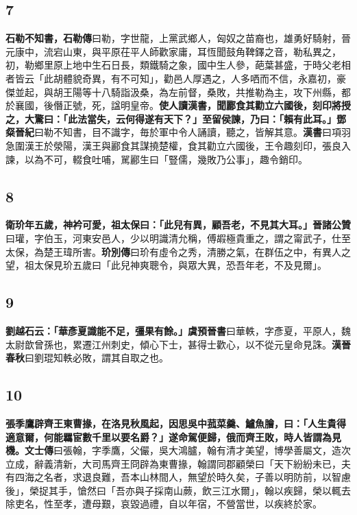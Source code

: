 \subsection*{7}

\textbf{石勒不知書，}{\footnotesize \textbf{石勒傳}曰勒，字世龍，上黨武鄉人，匈奴之苗裔也，雄勇好騎射，晉元康中，流宕山東，與平原茌平人師歡家庸，耳恆聞鼓角鞞鐸之音，勒私異之，初，勒鄉里原上地中生石日長，類鐵騎之象，國中生人參，葩葉甚盛，于時父老相者皆云「此胡體貌奇異，有不可知」，勸邑人厚遇之，人多哂而不信，永嘉初，豪傑並起，與胡王陽等十八騎詣汲桑，為左前督，桑敗，共推勒為主，攻下州縣，都於襄國，後僭正號，死，諡明皇帝。}\textbf{使人讀漢書，聞酈食其勸立六國後，刻印將授之，大驚曰：「此法當失，云何得遂有天下？」至留侯諫，乃曰：「賴有此耳。」}{\footnotesize \textbf{鄧粲晉紀}曰勒不知書，目不識字，毎於軍中令人誦讀，聽之，皆解其意。\textbf{漢書}曰項羽急圍漢王於滎陽，漢王與酈食其謀撓楚權，食其勸立六國後，王令趣刻印，張良入諫，以為不可，輟食吐哺，駡酈生曰「豎儒，幾敗乃公事」，趣令銷印。}

\subsection*{8}

\textbf{衛玠年五歲，神衿可愛，祖太保曰：「此兒有異，顧吾老，不見其大耳。」}{\footnotesize \textbf{晉諸公贊}曰瓘，字伯玉，河東安邑人，少以明識清允稱，傅嘏極貴重之，謂之甯武子，仕至太保，為楚王瑋所害。\textbf{玠別傳}曰玠有虛令之秀，清勝之氣，在群伍之中，有異人之望，祖太保見玠五歲曰「此兒神爽聰令，與眾大異，恐吾年老，不及見爾」。}

\subsection*{9}

\textbf{劉越石云：「華彥夏識能不足，彊果有餘。」}{\footnotesize \textbf{虞預晉書}曰華軼，字彥夏，平原人，魏太尉歆曾孫也，累遷江州刺史，傾心下士，甚得士歡心，以不從元皇命見誅。\textbf{漢晉春秋}曰劉琨知軼必敗，謂其自取之也。}

\subsection*{10}

\textbf{張季鷹辟齊王東曹掾，在洛見秋風起，因思吳中菰菜羹、鱸魚膾，曰：「人生貴得適意爾，何能羈宦數千里以要名爵？」遂命駕便歸，俄而齊王敗，時人皆謂為見機。}{\footnotesize \textbf{文士傳}曰張翰，字季鷹，父儼，吳大鴻臚，翰有清才美望，博學善屬文，造次立成，辭義清新，大司馬齊王冏辟為東曹掾，翰謂同郡顧榮曰「天下紛紛未已，夫有四海之名者，求退良難，吾本山林間人，無望於時久矣，子善以明防前，以智慮後」，榮捉其手，愴然曰「吾亦與子採南山蕨，飲三江水爾」，翰以疾歸，榮以輒去除吏名，性至孝，遭母艱，哀毀過禮，自以年宿，不營當世，以疾終於家。}

